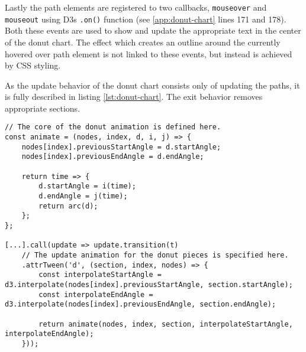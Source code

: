 Lastly the path elements are registered to two callbacks, \texttt{mouseover} and \texttt{mouseout} using D3s \texttt{.on()} function (see \ref{app:donut-chart} lines 171 and 178). Both these events are used to show and update the appropriate text in the center of the donut chart. The effect which creates an outline around the currently hovered over path element is not linked to these events, but instead is achieved by CSS styling.

As the update behavior of the donut chart consists only of updating the paths, it is fully described in listing \ref{lst:donut-chart}. The exit behavior removes appropriate sections.

\begin{minipage}{0.9\linewidth}
    \begin{lstlisting}[style=htmlCSSjs, captionpos=b, caption={The implementation of the arc update animations. As the core of the animation is used by the enter and the update behavior, it is defined first. The new values for start and end angle are stored on the node itself. This needs to be done to be able to reference these values again for the next update, as the previous angles will not be accessible through the pie object after regenerating it for an update. Finally the function which is called for each frame of the animation is defined and returned. This function first interpolates the start and end angle values using the passed interpolation functions and the time value. This time value is in the range of zero to one, depending on how far along the animation is. These newly interpolated angles define the start and end angle of the pie piece, which is then turned into a path element by calling the \texttt{arc} function for this pie piece. As the interpolate functions \texttt{interpolateStartAngle} and \texttt{interpolateEndAngle} differ for the enter and update behavior, they are defined in the respective sections. They are passed into the core \texttt{animate} function. (Section from \ref{app:donut-chart} lines 132ff and 186ff)}, label={lst:donut-chart}]
// The core of the donut animation is defined here.
const animate = (nodes, index, d, i, j) => {
    nodes[index].previousStartAngle = d.startAngle;
    nodes[index].previousEndAngle = d.endAngle;
    
    return time => {
        d.startAngle = i(time);
        d.endAngle = j(time);
        return arc(d);
    };
};

[...].call(update => update.transition(t)
    // The update animation for the donut pieces is specified here.
    .attrTween('d', (section, index, nodes) => {
        const interpolateStartAngle = d3.interpolate(nodes[index].previousStartAngle, section.startAngle);
        const interpolateEndAngle = d3.interpolate(nodes[index].previousEndAngle, section.endAngle);

        return animate(nodes, index, section, interpolateStartAngle, interpolateEndAngle);
    }));
    \end{lstlisting}
\end{minipage}


